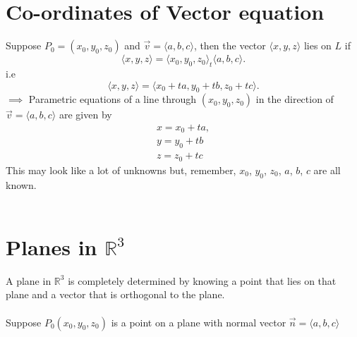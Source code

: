 \documentclass{report}
\begin{document}
\section{Co-ordinates of Vector equation}
    

Suppose $P_0 = \left( x_0,y_0,z_0 \right) $ and $\vec{v} = \langle a,b,c  \rangle $, then the vector $\langle x,y,z  \rangle $ lies on $L$ if
\[
\langle x,y,z  \rangle = \langle x_0,y_0,z_0  \rangle _ t \langle a,b,c  \rangle 
.\] i.e
\[
\langle x,y,z  \rangle = \langle x_0+ta, y_0+tb, z_0+tc  \rangle 
.\] 
$\implies$ Parametric equations of a line through $\left( x_0,y_0,z_0 \right) $ in the direction of $\vec{v} = \langle  a,b,c  \rangle $ are given by 
\begin{align*}
        x=x_0+ta,\\
        y=y_0+tb\\
        z=z_0+tc
\end{align*}
This may look like a lot of unknowns but, remember, $x_0$, $y_0$, $z_0$, $a$, $b$, $c$ are all known.\\
\\

\section{ Planes in $\mathbb{R}^3$}
A plane in $\mathbb{R}^3$ is completely determined by knowing a point that lies on that plane and a vector that is orthogonal to the plane.\\
\\
Suppose $P_0\left( x_0,y_0,z_0 \right) $ is a point on a plane with normal vector $\vec{n} = \langle a,b,c  \rangle $ \\
\\
\end{document}
